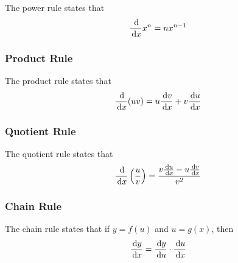 The power rule states that
\begin{equation}
  \frac{\,\mathrm{d}}{\,\mathrm{d} x} x^n=nx^{n-1}
\end{equation}

\subsubsection{Product Rule}

The product rule states that
\begin{equation}
  \frac{\,\mathrm{d}}{\,\mathrm{d} x} (uv)=u \frac{\,\mathrm{d} v}{\,\mathrm{d} x}+v\frac{\,\mathrm{d} u}{\,\mathrm{d} x}
\end{equation}

\subsubsection{Quotient Rule}

The quotient rule states that
\begin{equation}
  \frac{\,\mathrm{d}}{\,\mathrm{d} x}\left(\frac{u}{v}\right)=\frac{v\frac{\,\mathrm{d} u}{\,\mathrm{d} x}-u\frac{\,\mathrm{d} v}{\,\mathrm{d} x}}{v^2}
\end{equation}

\subsubsection{Chain Rule}

The chain rule states that if $y=f(u)$ and $u=g(x)$, then
\begin{equation}
  \frac{\,\mathrm{d} y}{\,\mathrm{d} x}=\frac{\,\mathrm{d} y}{\,\mathrm{d} u} \cdot \frac{\,\mathrm{d} u}{\,\mathrm{d} x}
\end{equation}


